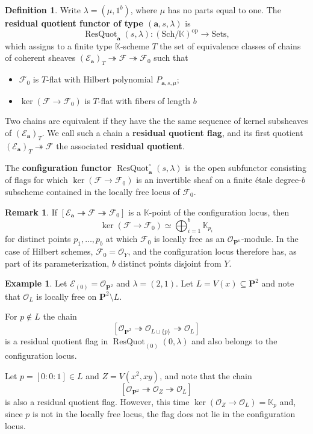 \documentclass[leqno,11pt,a4paper]{amsart}
\theoremstyle{definition}
\newtheorem{example}[example]{Example}
\newtheorem{remark}[remark]{Remark}
\newtheorem{definition}[definition]{Definition}
\numberwithin{equation}{section}
\newcommand{\kk}{\mathbb{K}}
\newcommand{\bfa}{\mathbf{a}}
\newcommand{\PP}{\mathbf{P}}
\newcommand{\EE}{\mathscr{E}}
\newcommand{\FF}{\mathscr{F}}
\newcommand{\OO}{\mathscr{O}}
\DeclareMathOperator{\ResQuot}{ResQuot}
\begin{document}
\begin{definition} \label{defn_residual}
Write $\lambda=(\mu,1^b)$, where $\mu$ has no parts equal to one.
The \textbf{residual quotient functor of type $(\bfa,s,\lambda)$} is
$$
\ResQuot_{\bfa}(s,\lambda): (\mathrm{Sch}/\kk)^{\mathrm{op}} \longrightarrow \mathrm{Sets},
$$
which assigns to a finite type $\kk$-scheme $T$ the set of equivalence classes of chains of coherent sheaves
$(\EE_{\bfa})_T \twoheadrightarrow \FF \twoheadrightarrow \FF_0$ such that
\begin{itemize}
\item$\FF_0$ is $T$-flat with Hilbert polynomial $P_{\bfa,s,\mu}$;
\item $\ker(\FF\to\FF_0)$ is $T$-flat with fibers of length $b$
\end{itemize}
Two chains are equivalent if they have the the same sequence of kernel subsheaves of $(\EE_{\bfa})_T$.
We call such a chain a \textbf{residual quotient flag}, and its
first quotient $(\EE_{\bfa})_T\twoheadrightarrow\FF$ the associated
\textbf{residual quotient}.


The \textbf{configuration functor} $\ResQuot_{\bfa}^{\circ}(s,\lambda)$ is the open subfunctor consisting
of flags for which $\ker(\FF\to\FF_0)$ is an invertible sheaf on a finite \'etale degree-$b$ subscheme contained in the locally free locus of $\FF_0$.
\end{definition}

\begin{remark} If $[\EE_{\bfa} \twoheadrightarrow\FF\twoheadrightarrow\FF_0]$ is a $\kk$-point of the configuration locus, then
$$
\ker(\FF\to\FF_0)\simeq\bigoplus_{i=1}^b\kk_{p_i}
$$
for distinct points $p_1,\ldots,p_b$ at which $\FF_0$ is locally free as an $\OO_{\PP^n}$-module. 
In the case of Hilbert schemes, $\FF_0=\OO_Y$, and the configuration locus therefore has, as part of its parameterization, $b$ distinct points disjoint from $Y$.
\end{remark}

\begin{example}
Let $\EE_{(0)}=\OO_{\PP^2}$ and $\lambda = (2,1)$. Let $L=V(x)\subseteq\PP^2$ and note that $\OO_L$ is locally free on $\PP^2 \setminus L$.

For $p \notin L$ the chain
$$
[\OO_{\PP^2}\twoheadrightarrow \OO_{L\sqcup\{p\}}\twoheadrightarrow\OO_L]
$$
is a residual quotient flag in $\ResQuot_{(0)}(0,\lambda)$ and also belongs to the configuration locus.

Let $p=[0:0:1] \in L$ and $Z=V(x^2,xy)$, and note that the chain
$$
[\OO_{\PP^2}\twoheadrightarrow\OO_Z\twoheadrightarrow\OO_L]
$$
is also a residual quotient flag. 
However, this time $\ker(\OO_Z \to \OO_L) = \kk_p$ and, since $p$ is not in the locally free locus, the flag does not lie in the configuration locus.
\end{example}
\end{document}
